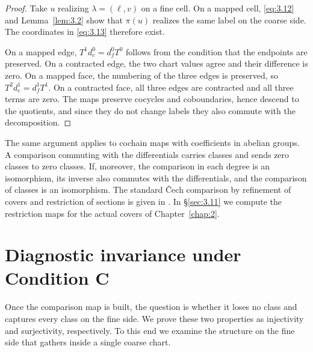 \begin{proof}

Take $u$ realizing $\lambda=(\ell,v)$ on a fine cell.
On a mapped cell, \eqref{eq:3.12} and Lemma~\ref{lem:3.2} show that $\pi(u)$ realizes
the same label on the coarse side.
The coordinates in \eqref{eq:3.13} therefore exist.

On a mapped edge, $T^1d_c^0=d_f^0T^0$ follows from the condition that the endpoints
are preserved. On a contracted edge, the two chart values agree and their difference
is zero. On a mapped face, the numbering of the three edges is preserved, so
$T^2d_c^1=d_f^1T^1$. On a contracted face, all three edges are contracted and all
three terms are zero. The maps preserve cocycles and coboundaries, hence descend to
the quotients, and since they do not change labels they also commute with the
decomposition.

\end{proof}

The same argument applies to cochain maps with coefficients in abelian groups.
A comparison commuting with the differentials carries classes and sends zero classes
to zero classes. If, moreover, the comparison in each degree is an isomorphism, its
inverse also commutes with the differentials, and the comparison of classes is an
isomorphism. The standard \v{C}ech comparison by refinement of covers and restriction
of sections is given in
\cite[\href{https://stacks.math.columbia.edu/tag/09UY}{Tag 09UY}]{Stacks}.
In \S\ref{sec:3.11} we compute the restriction maps for the actual covers of
Chapter~\ref{chap:2}.

\section{Diagnostic invariance under Condition C}\label{sec:3.5}

Once the comparison map is built, the question is whether it loses no class and
captures every class on the fine side. We prove these two properties as injectivity
and surjectivity, respectively. To this end we examine the structure on the
fine side that gathers inside a single coarse chart.

